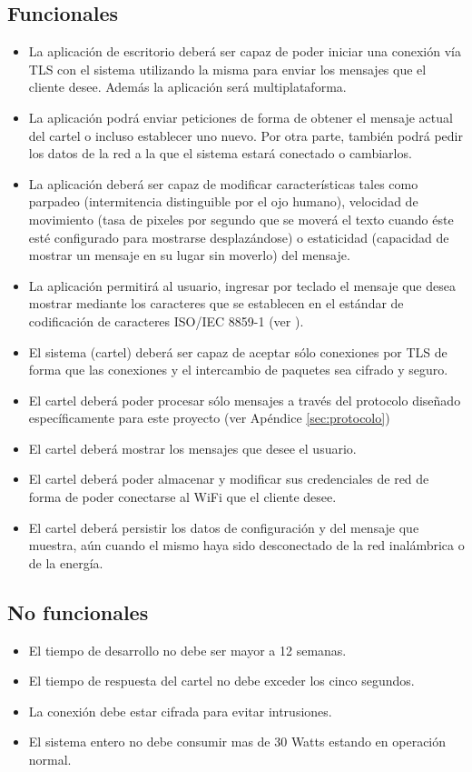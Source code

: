 \subsection{Funcionales}
\begin{itemize}
	\item La aplicación de escritorio deberá ser capaz de poder iniciar una conexión vía TLS con el sistema utilizando la misma para enviar los mensajes que el cliente desee. Además la aplicación será multiplataforma.
	\item La aplicación podrá enviar peticiones de forma de obtener el mensaje actual del cartel o incluso establecer uno nuevo. Por otra parte, también podrá pedir los datos de la red a la que el sistema estará conectado o cambiarlos.
	\item La aplicación deberá ser capaz de modificar características tales como parpadeo (intermitencia distinguible por el ojo humano), velocidad de movimiento (tasa de pixeles por segundo que se moverá el texto cuando éste esté configurado para mostrarse desplazándose) o estaticidad (capacidad de mostrar un mensaje en su lugar sin moverlo) del mensaje.
	\item La aplicación permitirá al usuario, ingresar por teclado el mensaje que desea mostrar mediante los caracteres que se establecen en el estándar de codificación de caracteres ISO/IEC 8859-1 (ver \cite{CodifChar}).
	\item El sistema (cartel) deberá ser capaz de aceptar sólo conexiones por TLS\cite{TLS} de forma que las conexiones y el intercambio de paquetes sea cifrado y seguro.
	\item El cartel deberá poder procesar sólo mensajes a través del protocolo diseñado específicamente para este proyecto (ver Apéndice \ref{sec:protocolo})
	\item El cartel deberá mostrar los mensajes que desee el usuario.
	\item El cartel deberá poder almacenar y modificar sus credenciales de red de forma de poder conectarse al WiFi que el cliente desee.
	\item El cartel deberá persistir los datos de configuración y del mensaje que muestra, aún cuando el mismo haya sido desconectado de la red inalámbrica o de la energía.
\end{itemize}

\subsection{No funcionales}
\begin{itemize}
	\item El tiempo de desarrollo no debe ser mayor a 12 semanas.
	\item El tiempo de respuesta del cartel no debe exceder los cinco segundos.
	\item La conexión debe estar cifrada para evitar intrusiones.
	\item El sistema entero no debe consumir mas de 30 Watts estando en operación normal.
\end{itemize}

